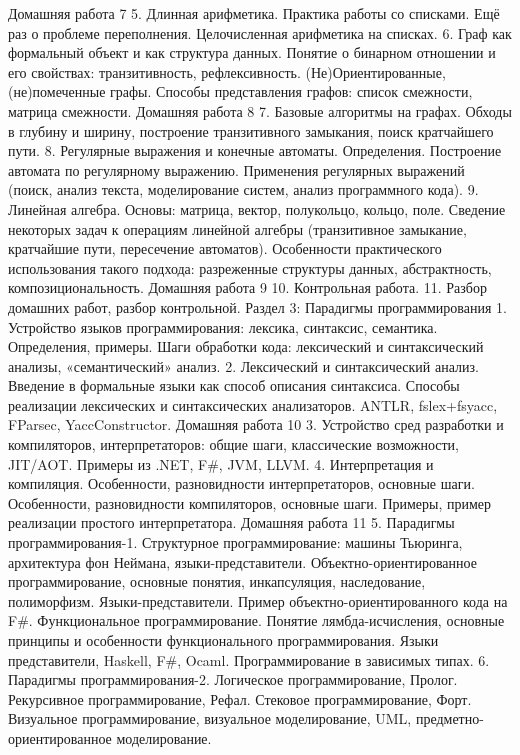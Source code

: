 Домашняя работа 7
    5. Длинная арифметика. Практика работы со списками. Ещё раз о проблеме переполнения. Целочисленная арифметика на списках. 
    6. Граф как формальный объект и как структура данных. Понятие о бинарном отношении и его свойствах: транзитивность, рефлексивность. (Не)Ориентированные, (не)помеченные графы. Способы представления графов: список смежности, матрица смежности.
Домашняя работа 8
    7. Базовые алгоритмы на графах. Обходы в глубину и ширину, построение транзитивного замыкания, поиск кратчайшего пути.
    8. Регулярные выражения и конечные автоматы. Определения. Построение автомата по регулярному выражению. Применения регулярных выражений (поиск, анализ текста, моделирование систем, анализ программного кода).
    9. Линейная алгебра. Основы: матрица, вектор, полукольцо, кольцо, поле. Сведение некоторых задач к операциям линейной алгебры (транзитивное замыкание, кратчайшие пути, пересечение автоматов). Особенности практического использования такого подхода: разреженные структуры данных, абстрактность, композициональность.
Домашняя работа 9
    10. Контрольная работа.
    11. Разбор домашних работ, разбор контрольной.
Раздел 3: Парадигмы программирования
    1. Устройство языков программирования: лексика, синтаксис, семантика. Определения, примеры. Шаги обработки кода: лексический и синтаксический анализы, «семантический» анализ.
    2. Лексический и синтаксический анализ. Введение в формальные языки как способ описания синтаксиса. Способы реализации лексических и синтаксических анализаторов. ANTLR, fslex+fsyacc, FParsec, YaccConstructor.
Домашняя работа 10
    3. Устройство сред разработки и компиляторов, интерпретаторов: общие шаги, классические возможности, JIT/AOT. Примеры из .NET, F#, JVM, LLVM.
    4. Интерпретация и компиляция. Особенности, разновидности интерпретаторов, основные шаги.  Особенности, разновидности компиляторов, основные шаги. Примеры, пример реализации простого интерпретатора.
Домашняя работа 11 
    5. Парадигмы программирования-1. Структурное программирование: машины Тьюринга, архитектура фон Неймана, языки-представители. Объектно-ориентированное программирование, основные понятия, инкапсуляция, наследование, полиморфизм. Языки-представители. Пример объектно-ориентированного кода на F#. Функциональное программирование. Понятие лямбда-исчисления, основные принципы и особенности функционального программирования. Языки представители, Haskell, F#, Ocaml. Программирование в зависимых типах.
    6. Парадигмы программирования-2. Логическое программирование, Пролог. Рекурсивное программирование, Рефал. Стековое программирование, Форт. Визуальное программирование, визуальное моделирование, UML, предметно-ориентированное моделирование.

